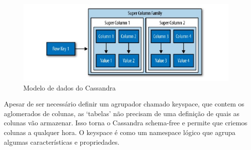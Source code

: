 	\begin{figure}[!htbp]
		\begin{center}
			\includegraphics[width=1\textwidth]{excassandra}
		\end{center}
		\caption{Modelo de dados do Cassandra}
		\label{fig:excassandra}
	\end{figure}

Apesar de ser necessário definir um agrupador chamado keyspace, que contem os aglomerados de colunas, as ‘tabelas’ não precisam de uma definição de quais as colunas vão armazenar. Isso torna o Cassandra schema-free e permite que criemos colunas a qualquer hora. O keyspace é como um namespace lógico que agrupa algumas características e propriedades. 






